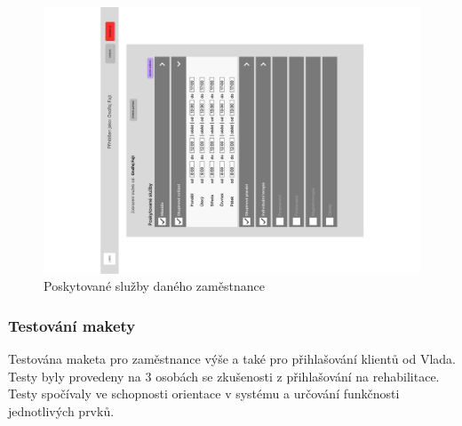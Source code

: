 \begin{figure}[htbp]
    \centering
    \includegraphics[angle=270, origin=c, width = \textwidth, trim=180 0 250 0, clip]{doc/latex/fig/ondra/figma3.pdf}
    \caption{Poskytované služby daného zaměstnance}
    \label{fig:Ondra_figma_services}
\end{figure}

\newpage

\subsubsection*{Testování makety}

Testována maketa pro zaměstnance výše a také pro přihlašování klientů od Vlada.
Testy byly provedeny na 3 osobách se zkušenosti z přihlašování na rehabilitace.
Testy spočívaly ve schopnosti orientace v systému a určování funkčnosti jednotlivých prvků.

